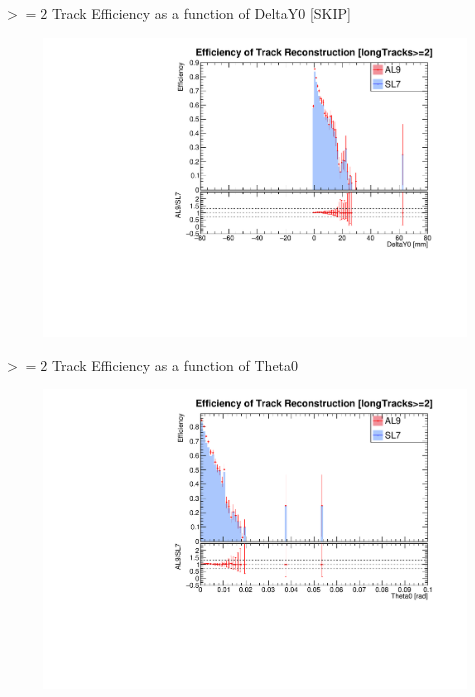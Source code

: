 \begin{frame}{$>=2$ Track Efficiency as a function of DeltaY0 [SKIP]}
    \begin{figure}
        \includegraphics[width=\linewidth]{./output/Effi_greq2_DeltaY0.pdf}
    \end{figure}
\end{frame}
\begin{frame}{$>=2$ Track Efficiency as a function of Theta0}
    \begin{figure}
        \includegraphics[width=\linewidth]{./output/Effi_greq2_Theta0.pdf}
    \end{figure}
\end{frame}
